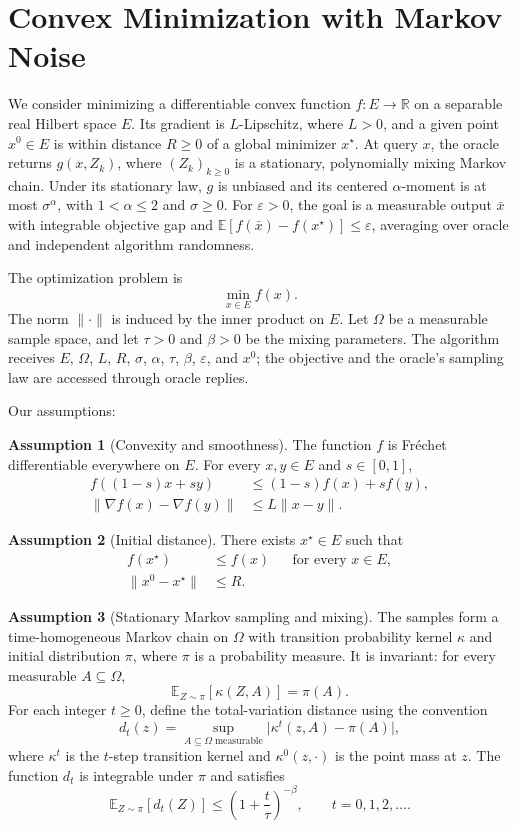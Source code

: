 \documentclass[10pt]{article}
\theoremstyle{definition}
\newtheorem{assumption}{Assumption}
\begin{document}
\section*{Convex Minimization with Markov Noise}
We consider minimizing a differentiable convex function $f:E\to\mathbb{R}$ on a separable real Hilbert space $E$. Its gradient is $L$-Lipschitz, where $L>0$, and a given point $x^0\in E$ is within distance $R\geq0$ of a global minimizer $x^\star$. At query $x$, the oracle returns $g(x,Z_k)$, where $(Z_k)_{k\geq0}$ is a stationary, polynomially mixing Markov chain. Under its stationary law, $g$ is unbiased and its centered $\alpha$-moment is at most $\sigma^\alpha$, with $1<\alpha\leq2$ and $\sigma\geq0$. For $\varepsilon>0$, the goal is a measurable output $\bar{x}$ with integrable objective gap and $\mathbb{E}[f(\bar{x})-f(x^\star)]\leq\varepsilon$, averaging over oracle and independent algorithm randomness.

The optimization problem is
\[
\min_{x\in E} f(x).
\]
The norm $\|\cdot\|$ is induced by the inner product on $E$. Let $\Omega$ be a measurable sample space, and let $\tau>0$ and $\beta>0$ be the mixing parameters. The algorithm receives $E$, $\Omega$, $L$, $R$, $\sigma$, $\alpha$, $\tau$, $\beta$, $\varepsilon$, and $x^0$; the objective and the oracle's sampling law are accessed through oracle replies.

Our assumptions:
\begin{assumption}[Convexity and smoothness]
The function $f$ is Fr\'echet differentiable everywhere on $E$. For every $x,y\in E$ and $s\in[0,1]$,
\[
\begin{aligned}
f((1-s)x+sy)&\leq (1-s)f(x)+sf(y),\\
\|\nabla f(x)-\nabla f(y)\|&\leq L\|x-y\|.
\end{aligned}
\]
\end{assumption}

\begin{assumption}[Initial distance]
There exists $x^\star\in E$ such that
\[
\begin{aligned}
f(x^\star)&\leq f(x) &&\text{for every }x\in E,\\
\|x^0-x^\star\|&\leq R.
\end{aligned}
\]
\end{assumption}

\begin{assumption}[Stationary Markov sampling and mixing]
The samples form a time-homogeneous Markov chain on $\Omega$ with transition probability kernel $\kappa$ and initial distribution $\pi$, where $\pi$ is a probability measure. It is invariant: for every measurable $A\subseteq\Omega$,
\[
\mathbb{E}_{Z\sim\pi}[\kappa(Z,A)]=\pi(A).
\]
For each integer $t\geq0$, define the total-variation distance using the convention
\[
d_t(z)=\sup_{A\subseteq\Omega\;\mathrm{measurable}}
\bigl|\kappa^t(z,A)-\pi(A)\bigr|,
\]
where $\kappa^t$ is the $t$-step transition kernel and $\kappa^0(z,\cdot)$ is the point mass at $z$. The function $d_t$ is integrable under $\pi$ and satisfies
\[
\mathbb{E}_{Z\sim\pi}[d_t(Z)]
\leq \left(1+\frac{t}{\tau}\right)^{-\beta},
\qquad t=0,1,2,\ldots.
\]
\end{assumption}
\end{document}
